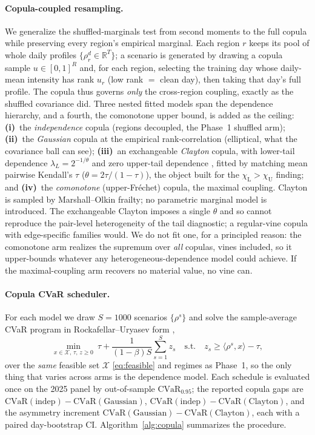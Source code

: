 \documentclass[10pt,twocolumn]{article}
\newcommand{\CVaR}{\mathrm{CVaR}}
\newcommand{\R}{\mathbb{R}}
\newcommand{\chiU}{\chi_{\mathrm{U}}}
\newcommand{\chiL}{\chi_{\mathrm{L}}}
\begin{document}
\paragraph{Copula-coupled resampling.} We generalize the shuffled-marginals test from
second moments to the full copula while preserving every region's empirical marginal.
Each region $r$ keeps its pool of whole daily profiles $\{\rho^d_r\in\R^T\}$; a
scenario is generated by drawing a copula sample $u\in[0,1]^R$ and, for each region,
selecting the training day whose daily-mean intensity has rank $u_r$ (low rank $=$
clean day), then taking that day's full profile. The copula thus governs \emph{only}
the cross-region coupling, exactly as the shuffled covariance did. Three nested fitted
models span the dependence hierarchy, and a fourth, the comonotone upper bound, is
added as the ceiling: \textbf{(i)}~the \emph{independence} copula (regions decoupled,
the Phase~1 shuffled arm); \textbf{(ii)}~the \emph{Gaussian} copula at the empirical
rank-correlation (elliptical, what the covariance ball can see); \textbf{(iii)}~an
exchangeable \emph{Clayton} copula, with lower-tail dependence
$\lambda_L=2^{-1/\theta}$ and zero upper-tail dependence \citep{joe2014}, fitted by
matching mean pairwise Kendall's $\tau$ ($\theta=2\tau/(1-\tau)$), the object built
for the $\chiL>\chiU$ finding; and \textbf{(iv)}~the \emph{comonotone} (upper-Fr\'echet)
copula, the maximal coupling. Clayton is sampled by Marshall--Olkin frailty; no
parametric marginal model is introduced. The exchangeable Clayton imposes a single
$\theta$ and so cannot reproduce the pair-level heterogeneity of the tail diagnostic; a
regular-vine copula with edge-specific families would. We do not fit one, for a
principled reason: the comonotone arm realizes the supremum over \emph{all} copulas,
vines included, so it upper-bounds whatever any heterogeneous-dependence model could
achieve. If the maximal-coupling arm recovers no material value, no vine can.

\paragraph{Copula CVaR scheduler.} For each model we draw $S=1000$ scenarios
$\{\rho^s\}$ and solve the sample-average CVaR program in Rockafellar--Uryasev form
\citep{rockafellar2000},
\begin{equation}
\min_{x\in\mathcal X,\,\tau,\,z\ge0}\ \tau+\frac{1}{(1-\beta)S}\sum_{s=1}^S z_s
\quad\text{s.t.}\quad z_s\ge\langle\rho^s,x\rangle-\tau,
\label{eq:saacvar}
\end{equation}
over the \emph{same} feasible set $\mathcal X$ \eqref{eq:feasible} and regimes as
Phase~1, so the only thing that varies across arms is the dependence model. Each
schedule is evaluated once on the 2025 panel by out-of-sample $\CVaR_{0.95}$; the
reported copula gaps are $\CVaR(\text{indep})-\CVaR(\text{Gaussian})$,
$\CVaR(\text{indep})-\CVaR(\text{Clayton})$, and the asymmetry increment
$\CVaR(\text{Gaussian})-\CVaR(\text{Clayton})$, each with a paired day-bootstrap CI.
Algorithm~\ref{alg:copula} summarizes the procedure.
\end{document}
